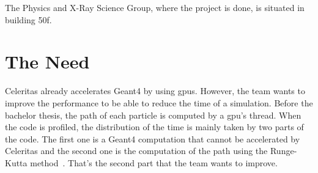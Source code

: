 The Physics and X-Ray Science Group, where the project is done, is situated in building 50f.


\section{The Need}
\label{spec:ch:context:need}

Celeritas already accelerates Geant4 by using \acrshort{gpu}s.
However, the team wants to improve the performance to be able to reduce the time of a simulation.
Before the bachelor thesis, the path of each particle is computed by a \acrshort{gpu}'s thread.
When the code is profiled, the distribution of the time is mainly taken by two parts of the code.
The first one is a Geant4 computation that cannot be accelerated by Celeritas and the second one is the computation of the path using the Runge-Kutta method~\cite{Runge-Kutta-methods}.
That's the second part that the team wants to improve.

